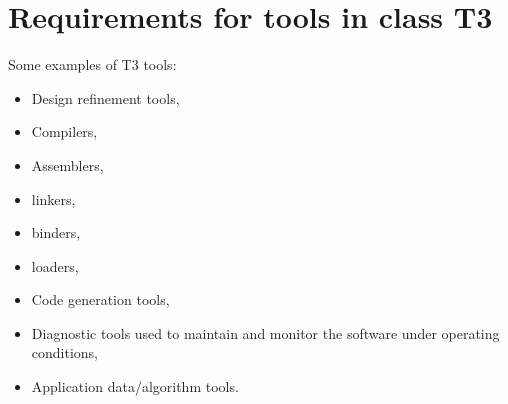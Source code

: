 \documentclass{template/openetcs_report}
\begin{document}
\section{Requirements for tools in class T3}
\label{T3}
Some examples of T3 tools: 
\begin{itemize}\itemsep=0pt
  \item Design refinement tools,
  \item Compilers,
  \item Assemblers,
  \item linkers,
  \item binders,
  \item loaders,
  \item Code generation tools,
  \item Diagnostic tools used to maintain and monitor the software under operating conditions,
  \item Application data/algorithm tools.
\end{itemize}
\end{document}
